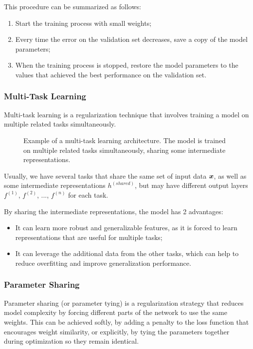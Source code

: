 This procedure can be summarized as follows:
\begin{enumerate}
    \item Start the training process with small weights;
    
    \item Every time the error on the validation set decreases, save a copy of the model parameters;
    
    \item When the training process is stopped, restore the model parameters to the values that achieved the best performance on the validation set.
\end{enumerate}

\subsubsection{Multi-Task Learning}
Multi-task learning is a regularization technique that involves training a model on multiple related tasks simultaneously.
\begin{figure}[H]
    \centering
    
    \caption{Example of a multi-task learning architecture. 
    The model is trained on multiple related tasks simultaneously, sharing some intermediate representations.}
    \label{fig:multi-task-learning}
\end{figure}

Usually, we have several tasks that share the same set of input data $\boldsymbol{x}$, as well as some intermediate representations $h^{(shared)}$,
but may have different output layers $f^{(1)}$, $f^{(2)}$, ..., $f^{(n)}$ for each task.

By sharing the intermediate representations, the model has 2 advantages:
\begin{itemize}
    \item It can learn more robust and generalizable features, as it is forced to learn representations that are useful for multiple tasks;
    \item It can leverage the additional data from the other tasks, which can help to reduce overfitting and improve generalization performance.
\end{itemize}

\subsubsection{Parameter Sharing}
Parameter sharing (or parameter tying) is a regularization strategy that reduces model complexity by forcing different parts of the network to use the same weights. 
This can be achieved softly, by adding a penalty to the loss function that encourages weight similarity, or explicitly, by tying the parameters together during optimization so they remain identical.

